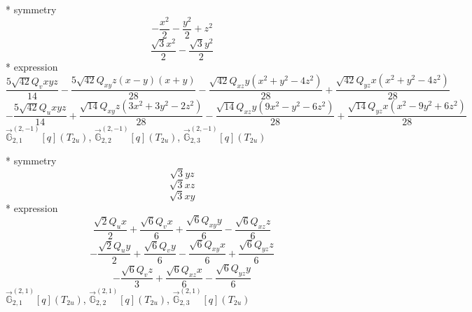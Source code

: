 \documentclass[fleqn,8pt]{jsarticle}
\begin{document}
\noindent\quad ** symmetry
\begin{dmath*}
- \frac{x^{2}}{2} - \frac{y^{2}}{2} + z^{2}
\end{dmath*}
\begin{dmath*}
\frac{\sqrt{3} x^{2}}{2} - \frac{\sqrt{3} y^{2}}{2}
\end{dmath*}
\noindent\quad ** expression
\begin{dmath*}
\frac{5 \sqrt{42} Q_{v} x y z}{14} - \frac{5 \sqrt{42} Q_{xy} z \left(x - y\right) \left(x + y\right)}{28} - \frac{\sqrt{42} Q_{xz} y \left(x^{2} + y^{2} - 4 z^{2}\right)}{28} + \frac{\sqrt{42} Q_{yz} x \left(x^{2} + y^{2} - 4 z^{2}\right)}{28}
\end{dmath*}
\begin{dmath*}
- \frac{5 \sqrt{42} Q_{u} x y z}{14} + \frac{\sqrt{14} Q_{xy} z \left(3 x^{2} + 3 y^{2} - 2 z^{2}\right)}{28} - \frac{\sqrt{14} Q_{xz} y \left(9 x^{2} - y^{2} - 6 z^{2}\right)}{28} + \frac{\sqrt{14} Q_{yz} x \left(x^{2} - 9 y^{2} + 6 z^{2}\right)}{28}
\end{dmath*}
\noindent\quad $\vec{\mathbb{G}}_{2,1}^{(2,-1)}[q](T_{2u})$, $\vec{\mathbb{G}}_{2,2}^{(2,-1)}[q](T_{2u})$, $\vec{\mathbb{G}}_{2,3}^{(2,-1)}[q](T_{2u})$

\noindent\quad ** symmetry
\begin{dmath*}
\sqrt{3} y z
\end{dmath*}
\begin{dmath*}
\sqrt{3} x z
\end{dmath*}
\begin{dmath*}
\sqrt{3} x y
\end{dmath*}
\noindent\quad ** expression
\begin{dmath*}
\frac{\sqrt{2} Q_{u} x}{2} + \frac{\sqrt{6} Q_{v} x}{6} + \frac{\sqrt{6} Q_{xy} y}{6} - \frac{\sqrt{6} Q_{xz} z}{6}
\end{dmath*}
\begin{dmath*}
- \frac{\sqrt{2} Q_{u} y}{2} + \frac{\sqrt{6} Q_{v} y}{6} - \frac{\sqrt{6} Q_{xy} x}{6} + \frac{\sqrt{6} Q_{yz} z}{6}
\end{dmath*}
\begin{dmath*}
- \frac{\sqrt{6} Q_{v} z}{3} + \frac{\sqrt{6} Q_{xz} x}{6} - \frac{\sqrt{6} Q_{yz} y}{6}
\end{dmath*}
\noindent\quad $\vec{\mathbb{G}}_{2,1}^{(2,1)}[q](T_{2u})$, $\vec{\mathbb{G}}_{2,2}^{(2,1)}[q](T_{2u})$, $\vec{\mathbb{G}}_{2,3}^{(2,1)}[q](T_{2u})$
\end{document}
